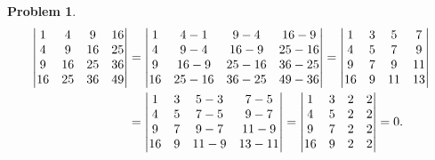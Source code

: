 \documentclass{article}
\theoremstyle{pprop}
\newtheorem{problem}{Problem}[section]
\begin{document}
\begin{problem}
  \begin{align*}
    \mqty|1 & 4 & 9 & 16 \\ 4 & 9 & 16 & 25 \\ 9 & 16 & 25 & 36 \\ 16 & 25 & 36 & 49|
    & =
    \mqty|1 & 4-1 & 9-4 & 16-9 \\ 4 & 9-4 & 16-9 & 25-16 \\ 9 & 16-9 & 25-16 & 36-25 \\ 16 & 25-16 & 36-25 & 49-36|
    =
    \mqty|1 & 3 & 5 & 7 \\ 4 & 5 & 7 & 9 \\ 9 & 7 & 9 & 11 \\ 16 & 9 & 11 & 13| \\
    & =
    \mqty|1 & 3 & 5-3 & 7-5 \\ 4 & 5 & 7-5 & 9-7 \\ 9 & 7 & 9-7 & 11-9 \\ 16 & 9 & 11-9 & 13-11|
    =
    \mqty|1 & 3 & 2 & 2 \\ 4 & 5 & 2 & 2 \\ 9 & 7 & 2 & 2 \\ 16 & 9 & 2 & 2|=0.
  \end{align*}
\end{problem}
\end{document}
